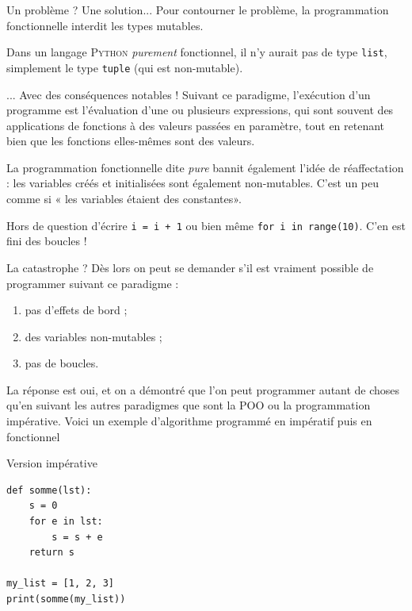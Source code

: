 \documentclass[10pt]{beamer}
\begin{document}
\begin{frame}[fragile]{Un problème ? Une solution...}
Pour contourner le problème, la programmation fonctionnelle interdit les types mutables.\\\pause

Dans un langage \textsc{Python} \textit{purement} fonctionnel, il n'y aurait pas de type \texttt{list}, simplement le type \texttt{tuple} (qui est non-mutable).\\
\end{frame}


\begin{frame}[fragile]{... Avec des conséquences notables !}
Suivant ce paradigme, l'exécution d'un programme est l'évaluation d'une ou plusieurs expressions, qui sont souvent des applications de fonctions à des valeurs passées en paramètre, tout en retenant bien que les fonctions elles-mêmes sont des valeurs.\\\pause 

La programmation fonctionnelle dite \textit{pure} bannit également l'idée de réaffectation : les variables créés et initialisées sont également non-mutables. C'est un peu comme si « les variables étaient des constantes».\\\pause

Hors de question d'écrire \texttt{i = i + 1} ou  bien même \texttt{for i in range(10)}. C'en est fini des boucles !\\
\end{frame}

\begin{frame}[fragile]{La catastrophe ?}
Dès lors on peut se demander s'il est vraiment possible de programmer suivant ce paradigme :\pause
\begin{enumerate}[--]
	\item 	pas d'effets de bord ;\pause 
	\item 	des variables non-mutables ;\pause
	\item 	pas de boucles.\pause 
\end{enumerate}
La réponse est oui, et on a démontré que l'on peut programmer autant de choses qu'en suivant les autres paradigmes que sont la POO ou la programmation impérative. Voici un exemple d'algorithme programmé en impératif puis en fonctionnel
\end{frame}

\begin{frame}[fragile]{Version impérative}
\begin{verbatim}
def somme(lst):
    s = 0
    for e in lst:
    	s = s + e
    return s

my_list = [1, 2, 3]
print(somme(my_list))
\end{verbatim}
\end{frame}
\end{document}
